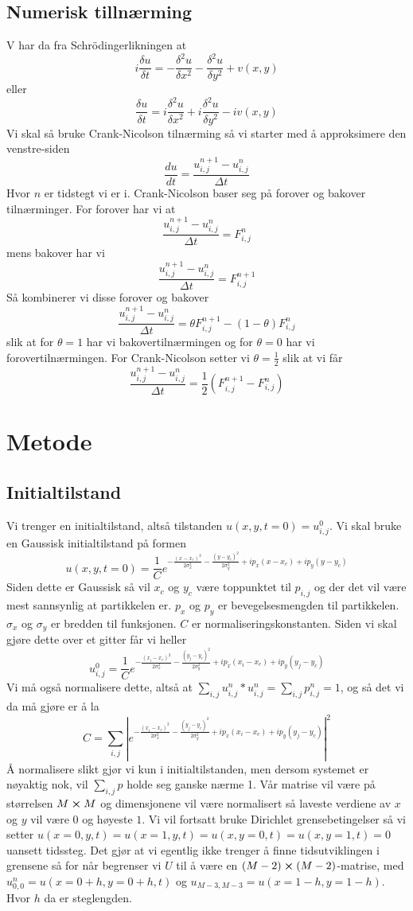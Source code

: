 \documentclass[reprint,english,notitlepage]{revtex4-2}  %
\begin{document}
\subsection{Numerisk tillnærming} 
V har da fra Schrödingerlikningen at
$$
i\frac{\delta u}{\delta t}=-\frac{\delta^2 u}{\delta x^2}-\frac{\delta^2 u}{\delta y^2}+v(x,y)
$$
eller 
$$
\frac{\delta u}{\delta t}=i\frac{\delta^2 u}{\delta x^2}+i\frac{\delta^2 u}{\delta y^2}-iv(x,y)
$$
Vi skal så bruke Crank-Nicolson tilnærming så vi starter med å approksimere den venstre-siden
$$
\frac{d u}{dt}=\frac{u^{n+1}_{i,j}-u^{n}_{i,j}}{\Delta t}
$$
Hvor $n$ er tidstegt vi er i.
Crank-Nicolson baser seg på forover og bakover tilnærminger. For forover har vi at
$$
\frac{u^{n+1}_{i,j}-u^{n}_{i,j}}{\Delta t}=F^{n}_{i,j}
$$ 
mens bakover har vi
$$
\frac{u^{n+1}_{i,j}-u^{n}_{i,j}}{\Delta t}=F^{n+1}_{i,j}
$$
Så kombinerer vi disse forover og bakover
$$
\frac{u^{n+1}_{i,j}-u^n_{i,j}}{\Delta t}=\theta F^{n+1}_{i,j}-(1-\theta)F^{n}_{i,j}
$$
slik at for $\theta=1$ har vi bakovertilnærmingen og for $\theta=0$ har vi forovertilnærmingen.
For Crank-Nicolson setter vi $\theta =\frac{1}{2}$ slik at vi får
$$
\frac{u^{n+1}_{i,j}-u^n_{i,j}}{\Delta t}=\frac{1}{2}(F^{n+1}_{i,j}-F^{n}_{i,j})
$$
\section{Metode}
\subsection{Initialtilstand}
Vi trenger en initialtilstand, altså tilstanden $u(x,y,t=0)=u^0_{i,j}$. Vi skal bruke en Gaussisk initialtilstand på formen
$$
u(x,y,t=0)=\frac{1}{C}e^{-\frac{(x-x_c)^2}{2\sigma_x^2}-\frac{(y-y_c)^2}{2\sigma_y^2}+ip_x(x-x_c)+ip_y(y-y_c)}
$$
Siden dette er Gaussisk så vil $x_c$ og $y_c$ være toppunktet til $p_{i,j}$ og der det vil være mest sannsynlig at partikkelen er. $p_x$ og $p_y$ er bevegelsesmengden til partikkelen. $\sigma_x$ og $\sigma_y$ er bredden til funksjonen. $C$ er normaliseringskonstanten. Siden vi skal gjøre dette over et gitter får vi heller
$$
u_{i,j}^0=\frac{1}{C}e^{-\frac{(x_i-x_c)^2}{2\sigma_x^2}-\frac{(y_j-y_c)^2}{2\sigma_y^2}+ip_x(x_i-x_c)+ip_y(y_j-y_c)}
$$
Vi må også normalisere dette, altså at $\sum_{i,j} u^n_{i,j}*u^n_{i,j}=\sum_{i,j}p^n_{i,j}=1$, og så det vi da må gjøre er å la
$$
C=\sum_{i,j}|e^{-\frac{(x_i-x_c)^2}{2\sigma_x^2}-\frac{(y_j-y_c)^2}{2\sigma_y^2}+ip_x(x_i-x_c)+ip_y(y_j-y_c)}|^2
$$
Å normalisere slikt gjør vi kun i initialtilstanden, men dersom systemet er nøyaktig nok, vil $\sum_{i,j}p$ holde seg ganske nærme 1. Vår matrise vil være på størrelsen $M\cross M$ og dimensjonene vil være normalisert så laveste verdiene av $x $ og $y$ vil være $0$ og høyeste $1$. Vi vil fortsatt bruke Dirichlet grensebetingelser så vi setter $u(x=0,y, t)=u(x=1,y, t)=u(x, y=0, t)=u(x,y=1, t)=0$ uansett tidssteg. Det gjør at vi egentlig ikke trenger å finne tidsutviklingen i grensene så for når begrenser vi $U$ til å være en $(M-2)\cross (M-2)$-matrise, med $u_{0,0}^n=u(x=0+h,y=0+h, t)$ og $u_{M-3,M-3}=u(x=1-h,y=1-h)$. Hvor $h$ da er steglengden.
\end{document}
